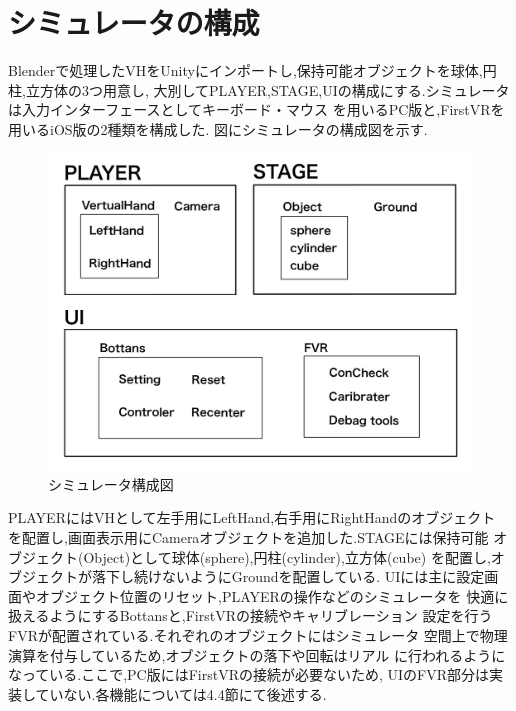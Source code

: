 \documentclass{ltjsreport}
\begin{document}
	\section{シミュレータの構成}
		Blenderで処理したVHをUnityにインポートし,保持可能オブジェクトを球体,円柱,立方体の3つ用意し,
		大別してPLAYER,STAGE,UIの構成にする.シミュレータは入力インターフェースとしてキーボード・マウス
		を用いるPC版と,FirstVRを用いるiOS版の2種類を構成した.
		図にシミュレータの構成図を示す.

		\begin{figure}[H]
		\centering
		\includegraphics[width = 12cm]{../figs/IMG_0340.JPG}
		\caption{シミュレータ構成図}
		\label{fig:simuraterconst}
		\end{figure}
		\vspace{-15pt}
		PLAYERにはVHとして左手用にLeftHand,右手用にRightHandのオブジェクト
		を配置し,画面表示用にCameraオブジェクトを追加した.STAGEには保持可能
		オブジェクト(Object)として球体(sphere),円柱(cylinder),立方体(cube)
		を配置し,オブジェクトが落下し続けないようにGroundを配置している.
		UIには主に設定画面やオブジェクト位置のリセット,PLAYERの操作などのシミュレータを
		快適に扱えるようにするBottansと,FirstVRの接続やキャリブレーション
		設定を行うFVRが配置されている.それぞれのオブジェクトにはシミュレータ
		空間上で物理演算を付与しているため,オブジェクトの落下や回転はリアル
		に行われるようになっている.ここで,PC版にはFirstVRの接続が必要ないため,
		UIのFVR部分は実装していない.各機能については4.4節にて後述する.
\end{document}

